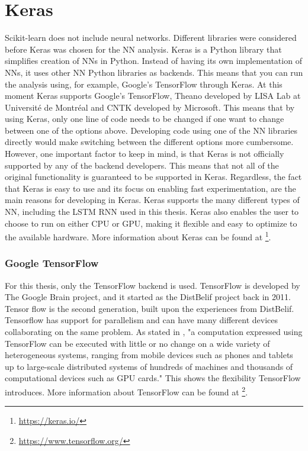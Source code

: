 \section{Keras}
    Scikit-learn does not include neural networks. Different libraries were considered before Keras was chosen for the NN analysis. Keras \cite{chollet2015keras} is a Python library that simplifies creation of NNs in Python. Instead of having its own implementation of NNs, it uses other NN Python libraries as backends. This means that you can run the analysis using, for example, Google's TensorFlow through Keras. At this moment Keras supports Google's TensorFlow, Theano developed by LISA Lab at Université de Montréal and CNTK developed by Microsoft. This means that by using Keras, only one line of code needs to be changed if one want to change between one of the options above. Developing code using one of the NN libraries directly would make switching between the different options more cumbersome. However, one important factor to keep in mind, is that Keras is not officially supported by any of the backend developers. This means that  not all of the original functionality is guaranteed to be supported in Keras. Regardless, the fact that Keras is easy to use and its focus on enabling fast experimentation, are the main reasons for developing in Keras. Keras supports the many different types of NN, including the LSTM RNN used in this thesis. Keras also enables the user to choose to run on either CPU or GPU, making it flexible and easy to optimize to the available hardware. More information about Keras can be found at \footnote{\url{https://keras.io/}}.
        
    \subsubsection{Google TensorFlow}
        For this thesis, only the TensorFlow backend is used. TensorFlow \cite{Abadi} is developed by The Google Brain project, and it started as the DistBelif project back in 2011. Tensor flow is the second generation, built upon the experiences from DistBelif. Tensorflow has support for parallelism and can have many different devices collaborating on the same problem. As stated in \cite{Abadi}, "a computation expressed using TensorFlow can be executed with little or no change on a wide variety of heterogeneous systems, ranging from mobile devices such as phones and tablets up to large-scale distributed systems of hundreds of machines and thousands of computational devices such as GPU cards." This shows the flexibility TensorFlow introduces. More information about TensorFlow can be found at \footnote{\url{https://www.tensorflow.org/}}.
    
    
    